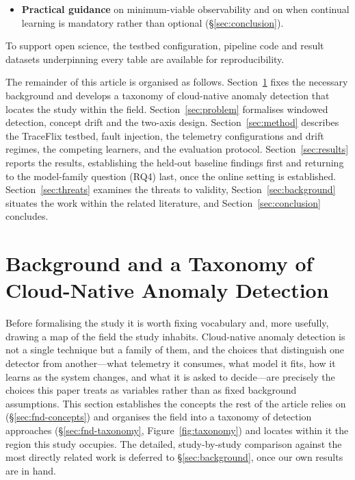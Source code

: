 \documentclass[pdflatex,sn-mathphys-num]{sn-jnl}%
\theoremstyle{thmstyleone}%
\theoremstyle{thmstyletwo}%
\theoremstyle{thmstylethree}%
\begin{document}
\begin{itemize}
  \item \textbf{Practical guidance} on minimum-viable observability and on when continual learning is mandatory rather than optional (\S\ref{sec:conclusion}).
\end{itemize}

To support open science, the testbed configuration, pipeline code and result datasets underpinning every table are available for reproducibility.

The remainder of this article is organised as follows. Section~\ref{sec:foundations} fixes the necessary background and develops a taxonomy of cloud-native anomaly detection that locates the study within the field. Section~\ref{sec:problem} formalises windowed detection, concept drift and the two-axis design. Section~\ref{sec:method} describes the TraceFlix testbed, fault injection, the telemetry configurations and drift regimes, the competing learners, and the evaluation protocol. Section~\ref{sec:results} reports the results, establishing the held-out baseline findings first and returning to the model-family question (RQ4) last, once the online setting is established. Section~\ref{sec:threats} examines the threats to validity, Section~\ref{sec:background} situates the work within the related literature, and Section~\ref{sec:conclusion} concludes.

\section{Background and a Taxonomy of Cloud-Native Anomaly Detection}\label{sec:foundations}

Before formalising the study it is worth fixing vocabulary and, more usefully, drawing a map of the field the study inhabits. Cloud-native anomaly detection is not a single technique but a family of them, and the choices that distinguish one detector from another---what telemetry it consumes, what model it fits, how it learns as the system changes, and what it is asked to decide---are precisely the choices this paper treats as variables rather than as fixed background assumptions. This section establishes the concepts the rest of the article relies on (\S\ref{sec:fnd-concepts}) and organises the field into a taxonomy of detection approaches (\S\ref{sec:fnd-taxonomy}, Figure~\ref{fig:taxonomy}) and locates within it the region this study occupies. The detailed, study-by-study comparison against the most directly related work is deferred to \S\ref{sec:background}, once our own results are in hand.
\end{document}
